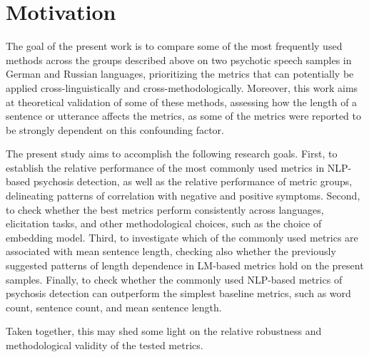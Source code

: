 
\section{Motivation}
\label{sec:intro:motivation}

The goal of the present work is to compare some of the most frequently used methods across the groups described above on two psychotic speech samples in German and Russian languages, prioritizing the metrics that can potentially be applied cross-linguistically and cross-methodologically. Moreover, this work aims at theoretical validation of some of these methods, assessing how the length of a sentence or utterance affects the metrics, as some of the metrics were reported to be strongly dependent on this confounding factor.

The present study aims to accomplish the following research goals. First, to establish the relative performance of the most commonly used metrics in NLP-based psychosis detection, as well as the relative performance of metric groups, delineating patterns of correlation with negative and positive symptoms. Second, to check whether the best metrics perform consistently across languages, elicitation tasks, and other methodological choices, such as the choice of embedding model. Third, to investigate which of the commonly used metrics are associated with mean sentence length, checking also whether the previously suggested patterns of length dependence in LM-based metrics hold on the present samples. Finally, to check whether the commonly used NLP-based metrics of psychosis detection can outperform the simplest baseline metrics, such as word count, sentence count, and mean sentence length.


Taken together, this may shed some light on the relative robustness and methodological validity of the tested metrics.



